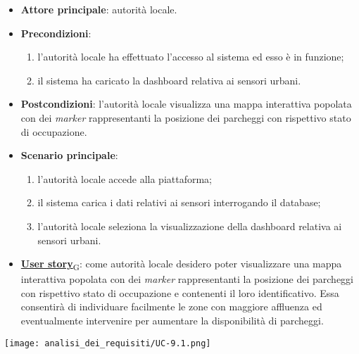 \begin{itemize}
	\item \textbf{Attore principale}: autorità locale.
	\item \textbf{Precondizioni}:
	      \begin{enumerate}
		      \item l'autorità locale ha effettuato l'accesso al sistema ed esso è in funzione;
		      \item il sistema ha caricato la dashboard relativa ai sensori urbani.
	      \end{enumerate}
	\item \textbf{Postcondizioni}: l'autorità locale visualizza una mappa interattiva popolata con dei \textit{marker} rappresentanti la posizione dei parcheggi con rispettivo stato di occupazione.
	\item \textbf{Scenario principale}:
	      \begin{enumerate}
		      \item l'autorità locale accede alla piattaforma;
		      \item il sistema carica i dati relativi ai sensori interrogando il database;
		      \item l'autorità locale seleziona la visualizzazione della dashboard relativa ai sensori urbani.
	      \end{enumerate}
	\item \href{https://7last.github.io/docs/pb/documentazione-interna/glossario\#user-story}{\textbf{User story}\textsubscript{G}}:
	      come autorità locale desidero poter visualizzare una mappa interattiva popolata con dei \textit{marker} rappresentanti la posizione dei parcheggi con rispettivo stato di occupazione
	      e contenenti il loro identificativo. Essa consentirà di individuare facilmente le zone con maggiore affluenza ed eventualmente intervenire per aumentare la disponibilità di parcheggi.
\end{itemize}
\begin{center}
	\texttt{[image: analisi\_dei\_requisiti/UC-9.1.png]}
\end{center}

